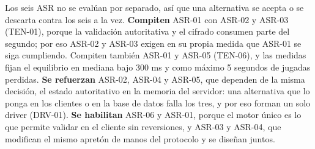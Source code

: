 Los seis ASR no se evalúan por separado, así que una alternativa se acepta o se descarta contra los seis a la vez. \textbf{Compiten} ASR-01 con ASR-02 y ASR-03 (TEN-01), porque la validación autoritativa y el cifrado consumen parte del segundo; por eso ASR-02 y ASR-03 exigen en su propia medida que ASR-01 se siga cumpliendo. Compiten también ASR-01 y ASR-05 (TEN-06), y las medidas fijan el equilibrio en mediana bajo 300 ms y como máximo 5 segundos de jugadas perdidas. \textbf{Se refuerzan} ASR-02, ASR-04 y ASR-05, que dependen de la misma decisión, el estado autoritativo en la memoria del servidor: una alternativa que lo ponga en los clientes o en la base de datos falla los tres, y por eso forman un solo driver (DRV-01). \textbf{Se habilitan} ASR-06 y ASR-01, porque el motor único es lo que permite validar en el cliente sin reversiones, y ASR-03 y ASR-04, que modifican el mismo apretón de manos del protocolo y se diseñan juntos.
